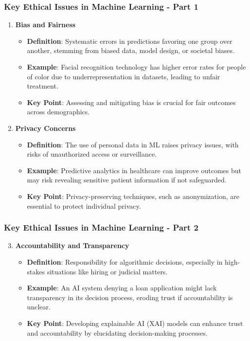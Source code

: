 \documentclass[aspectratio=169]{beamer}
\begin{document}
\begin{frame}[fragile]
    \frametitle{Key Ethical Issues in Machine Learning - Part 1}
    \begin{enumerate}
        \item \textbf{Bias and Fairness}
            \begin{itemize}
                \item \textbf{Definition}: Systematic errors in predictions favoring one group over another, stemming from biased data, model design, or societal biases.
                \item \textbf{Example}: Facial recognition technology has higher error rates for people of color due to underrepresentation in datasets, leading to unfair treatment.
                \item \textbf{Key Point}: Assessing and mitigating bias is crucial for fair outcomes across demographics.
            \end{itemize}

        \item \textbf{Privacy Concerns}
            \begin{itemize}
                \item \textbf{Definition}: The use of personal data in ML raises privacy issues, with risks of unauthorized access or surveillance.
                \item \textbf{Example}: Predictive analytics in healthcare can improve outcomes but may risk revealing sensitive patient information if not safeguarded.
                \item \textbf{Key Point}: Privacy-preserving techniques, such as anonymization, are essential to protect individual privacy.
            \end{itemize}
    \end{enumerate}
\end{frame}

\begin{frame}[fragile]
    \frametitle{Key Ethical Issues in Machine Learning - Part 2}
    \begin{enumerate}
        \setcounter{enumi}{2}
        \item \textbf{Accountability and Transparency}
            \begin{itemize}
                \item \textbf{Definition}: Responsibility for algorithmic decisions, especially in high-stakes situations like hiring or judicial matters.
                \item \textbf{Example}: An AI system denying a loan application might lack transparency in its decision process, eroding trust if accountability is unclear.
                \item \textbf{Key Point}: Developing explainable AI (XAI) models can enhance trust and accountability by elucidating decision-making processes.
            \end{itemize}
    \end{enumerate}
\end{frame}
\end{document}

